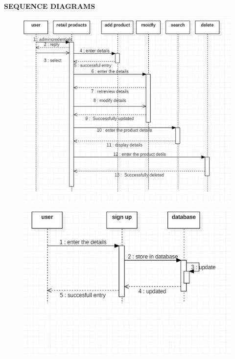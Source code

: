 \documentclass{tcc}
\begin{document}
\newpage
\begin{center}
\textbf{\Large{SEQUENCE DIAGRAMS}}
\end{center}
\begin{figure}[H]
\centering
\includegraphics{images/prductmodifyseq1.PNG}\\
\end{figure}
\begin{figure}[H]
\centering
\includegraphics{images/signup.PNG}\\
\end{figure}
\end{document}
